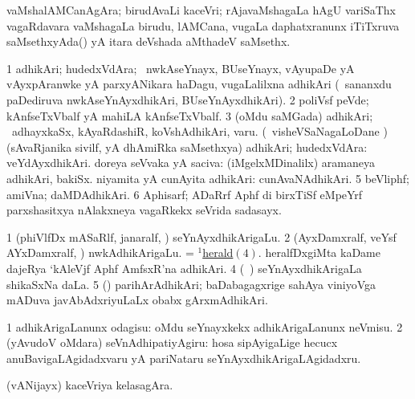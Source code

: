 \bentry
{}
\gl{\nA}
\bmng
vaMshalAMCanAgAra; birudAvaLi kaceVri; rAjavaMshagaLa hAgU variSaThx vagaRdavara vaMshagaLa birudu, lAMCana, \mo vugaLa daphatxranunx iTiTxruva saMsethxyAda(\birx)  yA itara deVshada aMthadeV saMsethx. 
\emng
\eentry

\bentry
{}
\gl{\nA}
\bmng
\bnum
\num{1} adhikAri; hudedxVdAra; \kanmu\ nwkAseYnayx, BUseYnayx, vAyupaDe yA vAyxpAranwke yA parxyANikara haDagu, \mo vugaLalilxna adhikAri (\kanmu\ sananxdu paDediruva nwkAseYnAyxdhikAri, BUseYnAyxdhikAri). 
\num{2} poliVsf peVde; kAnfseTxVbalf yA mahiLA kAnfseTxVbalf. 
\num{3} (oMdu saMGada) adhikAri; \kanmu\ adhayxkaSx, kAyaRdashiR, koVshAdhikAri, \mo varu. 
 (\sA\ visheVSaNagaLoDane \parx) 
\banum
{} (sAvaRjanika sivilf, yA dhAmiRka saMsethxya) adhikAri; hudedxVdAra:  veYdAyxdhikAri. 
 doreya seVvaka yA saciva:  (iMgelxMDinalilx) aramaneya adhikAri, bakiSx. 
 niyamita yA cunAyita adhikAri:  cunAvaNAdhikAri. 
\eanum
\numie
\num{5} beVliphf; amiVna; daMDAdhikAri. 
\num{6} Aphisarf; ADaRrf Aphf di birxTiSf eMpeYrf parxshasitxya nAlakxneya vagaRkekx seVrida sadasayx. 
\enum
\emng

\noindent
\gl{\pagu}
\bmng
\bnum
\num{1}  (phiVlfDx mASaRlf, janaralf, \mo) seYnAyxdhikArigaLu. 
\num{2}  (AyxDamxralf, veYsf AYxDamxralf, \mo) nwkAdhikArigaLu. 
  
\banum
{} = \hyperref{kandict_h.pdf}{H}{herald(1)4}{$^1$herald\((4)\)}. 
 heralfDxgiMta kaDame dajeRya `kAleVjf Aphf AmfsxR'na adhikAri. 
\eanum
\numie
\num{4}  (\saMkiSx\ ) seYnAyxdhikArigaLa shikaSxNa daLa. 
\num{5}  (\birx) parihArAdhikAri; baDabagagxrige sahAya viniyoVga mADuva javAbAdxriyuLaLx obabx gArxmAdhikAri. 
\enum
\emng
\eentry

\bentry
{}
\gl{\sakirx}
\bmng
\bnum
\num{1} adhikArigaLanunx odagisu:  oMdu seYnayxkekx adhikArigaLanunx neVmisu. 
\num{2} (yAvudoV oMdara) seVnAdhipatiyAgiru:  hosa sipAyigaLige hecucx anuBavigaLAgidadxvaru yA pariNataru seYnAyxdhikArigaLAgidadxru. 
\enum
\emng
\eentry

\bentry
{}
\gl{\nA}
\bmng
(vANijayx) kaceVriya kelasagAra. 
\emng
\eentry

